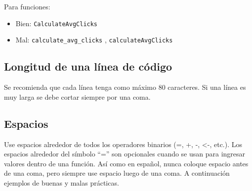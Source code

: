 \documentclass[10pt,]{krantz}
\begin{document}
Para funciones:

\begin{itemize}
    \item Bien: \verb|CalculateAvgClicks| 
    \item Mal: \verb|calculate_avg_clicks| , \verb|calculateAvgClicks|
\end{itemize}

\subsection{Longitud de una línea de
código}\label{longitud-de-una-linea-de-codigo}

Se recomienda que cada línea tenga como máximo 80 caracteres. Si una
línea es muy larga se debe cortar siempre por una coma.

\subsection{Espacios}\label{espacios}

Use espacios alrededor de todos los operadores binarios (=, +, -,
\textless{}-, etc.). Los espacios alrededor del símbolo ``='' son
opcionales cuando se usan para ingresar valores dentro de una función.
Así como en español, nunca coloque espacio antes de una coma, pero
siempre use espacio luego de una coma. A continuación ejemplos de buenas
y malas prácticas.
\end{document}
